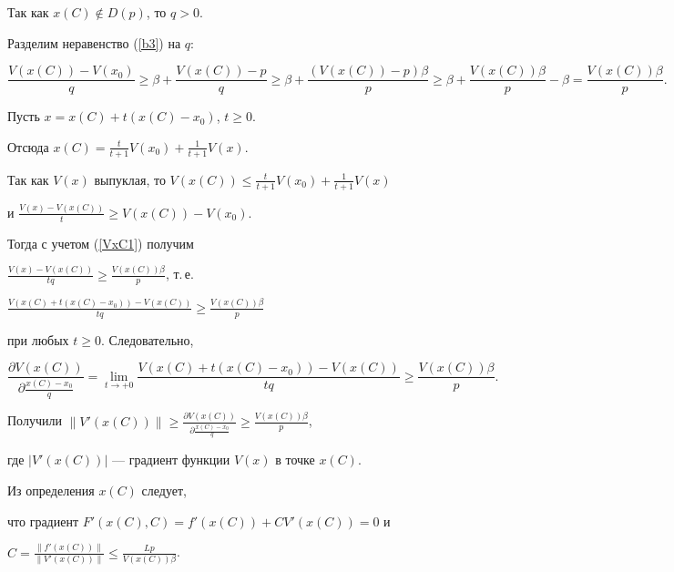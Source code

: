 \begin{pf}
\begin{equation}
\end{equation}


Так как $x(C)\notin D(p)$, то $q>0$.


Разделим неравенство (\ref{b3}) на $q$:


\begin{equation}\label{VxC1}


\frac{V(x(C))-V(x_0)} {q} \geq \beta+ \frac{V(x(C))-p} 


{q}\geq\beta+\frac{(V(x(C))-p)\beta} {p}


\geq\beta+\frac{V(x(C))\beta}{p}-\beta=\frac{V(x(C))\beta}{p}.


\end{equation}


Пусть $x=x(C) + t(x(C) - x_0)$, $t\geq 0$.


Отсюда $x(C)= \frac{t}{t+1} V(x_0)+\frac{1}{t+1} V(x)$.


Так как $V(x)$ выпуклая, то $V(x(C))\leq


\frac{t}{t+1}V(x_0)+\frac{1}{t+1}V(x)$


и $\frac{V(x)-V(x(C))}{t}\geq V(x(C))-V(x_0)$.


Тогда с учетом (\ref{VxC1}) получим 


$\frac{V(x)-V(x(C))}{tq}\geq\frac{V(x(C))\beta}{p}$, т.\,е.


$\frac{V(x(C)+t(x(C)-x_0))-V(x(C))}{tq}\geq\frac{V(x(C))\beta}{p}$ 


при любых $t\geq 0$. Следовательно,


$$


\frac{\partial V(x(C))}{\partial\frac{x(C)-x_0}{q}}=


\lim_{t\to+0}\frac{V(x(C)+t(x(C)-x_0))-V(x(C))}{tq}


\geq\frac{V(x(C))\beta}{p}.


$$


Получили $\|V'(x(C))\|\geq\frac{\partial V(x(C))}


{\partial\frac{x(C)-x_0}{q}} 


\geq\frac{V(x(C))\beta}{p}$,


где $|V'(x(C))|$ --- градиент функции $V(x)$ в точке $x(C)$.





Из определения $x(C)$ следует,


что градиент $F'(x(C),C)=f'(x(C))+CV'(x(C))=0$ и


$C=\frac{\|f'(x(C))\|}{\|V'(x(C))\|}\leq\frac{Lp}{V(x(C))\beta}$.


\end{pf}





